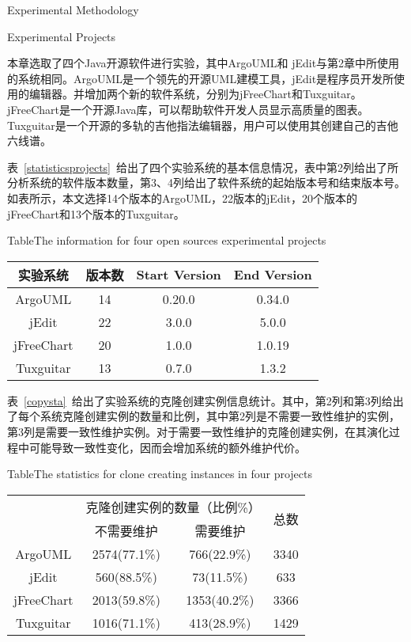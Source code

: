 {Experimental Methodology}

{Experimental Projects}

本章选取了四个Java开源软件进行实验，其中ArgoUML和 jEdit与第2章中所使用的系统相同。ArgoUML是一个领先的开源UML建模工具，jEdit是程序员开发所使用的编辑器。并增加两个新的软件系统，分别为jFreeChart和Tuxguitar。jFreeChart是一个开源Java库，可以帮助软件开发人员显示高质量的图表。Tuxguitar是一个开源的多轨的吉他指法编辑器，用户可以使用其创建自己的吉他六线谱。

表~\ref{statisticsprojects}~给出了四个实验系统的基本信息情况，表中第2列给出了所分析系统的软件版本数量，第3、4列给出了软件系统的起始版本号和结束版本号。如表所示，本文选择14个版本的ArgoUML，22版本的jEdit，20个版本的jFreeChart和13个版本的Tuxguitar。

\begin{table}[htbp]
{Table$\!$}{The information for four open sources experimental projects }
\vspace{0.5em}
\centering 
\wuhao
\begin{tabular}{cccc}
\toprule[1.5pt ]
{实验系统}&{版本数}&Start Version&End Version\\ 
\midrule[1pt]
ArgoUML&14&0.20.0&0.34.0\\ 
jEdit&22&3.0.0&5.0.0\\ 
jFreeChart&20&1.0.0&1.0.19\\ 
Tuxguitar&13&0.7.0&1.3.2\\ 
\bottomrule[1.5pt]
\end{tabular}
\end{table}

表~\ref{copysta}~给出了实验系统的克隆创建实例信息统计。其中，第2列和第3列给出了每个系统克隆创建实例的数量和比例，其中第2列是不需要一致性维护的实例，第3列是需要一致性维护实例。对于需要一致性维护的克隆创建实例，在其演化过程中可能导致一致性变化，因而会增加系统的额外维护代价。

\begin{table}[htbp]
{Table$\!$}{The statistics for clone creating instances in four projects}
\vspace{0.5em}
\centering
\wuhao
\begin{tabular}{cccc}
\toprule[1.5pt]
~\multirow{2}{*}{实验系统}& \multicolumn{2}{c}{克隆创建实例的数量（比例\%）} & \multirow{2}{*}{总数}\\ 
 \cline{2-3}
~&{不需要维护} &{需要维护} & ~\\
\midrule[1pt]
ArgoUML&	2574(77.1\%)&	766(22.9\%)&	3340\\
jEdit&	560(88.5\%)&	73(11.5\%)&	633\\
jFreeChart&	2013(59.8\%)&	1353(40.2\%)&	3366\\
Tuxguitar&	1016(71.1\%)&	413(28.9\%)&	1429\\
\bottomrule[1.5pt]
\end{tabular}
\end{table}

